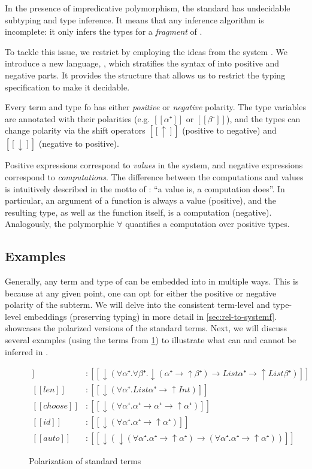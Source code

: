 \label{sec:overview}

In the presence of impredicative polymorphism, the standard \systemf has
undecidable subtyping and type inference. It means that any inference algorithm
is incomplete: it only infers the types for a \emph{fragment} of \systemf. 

To tackle this issue, we restrict \systemf by employing the ideas from the \CBPV
system \cite{levy2006:cbpv}. We introduce a new language, \fexists, which
stratifies the syntax of \systemf into positive and negative parts. It provides
the structure that allows us to restrict the typing specification to make it
decidable.

Every term and type fo \fexists has either \emph{positive} or \emph{negative}
polarity. The type variables are annotated with their polarities (e.g. $[[α⁺]]$
or $[[β⁻]]$), and the types can change polarity via the shift operators $[[↑]]$
(positive to negative) and $[[↓]]$ (negative to positive).

Positive expressions correspond to \emph{values} in the \CBPV system, and
negative expressions correspond to \emph{computations}. The difference between
the computations and values is intuitively described in the motto of \CBPV: ``a
value is, a computation does''. In particular, an argument of a function is
always a value (\ie positive), and the resulting type, as well as the function
itself, is a computation (\ie negative). Analogously, the polymorphic
$\forall$ quantifies a computation over positive types. 

\subsection{Examples}

Generally, any term and type of \systemf can be embedded into \fexists in
multiple ways. This is because at any given point, one can opt for either the
positive or negative polarity of the subterm. We will delve into the consistent
term-level and type-level embeddings (\ie preserving typing) in more detail in
\cref{sec:rel-to-systemf}.  showcases the
polarized versions of the standard \systemf terms. Next, we will discuss several
examples (using the terms from \cref{fig:polarization-examples}) to illustrate
what can and cannot be inferred in \fexists.

\begin{figure}[h]
  \begin{align*}
    [[map]] &: [[↓(∀α⁺.∀β⁺.↓(α⁺ → ↑β⁺) → List α⁺ → ↑List β⁺)]] \\
    [[len]] &: [[↓(∀α⁺.List α⁺ → ↑Int)]] \\
    [[choose]] &: [[↓(∀α⁺.α⁺ → α⁺ → ↑α⁺)]] \\
    [[id]] &: [[↓(∀α⁺.α⁺ → ↑α⁺)]] \\
    [[auto]] &: [[↓(↓(∀α⁺.α⁺ → ↑α⁺) → (∀α⁺.α⁺ → ↑α⁺))]]
  \end{align*}
  \caption{Polarization of standard \systemf terms}
  \label{fig:polarization-examples}
\end{figure}

